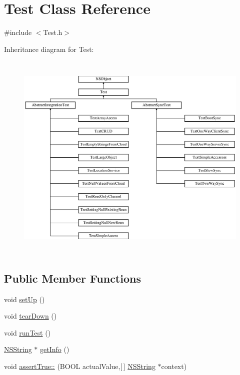 \hypertarget{interface_test}{
\section{\-Test \-Class \-Reference}
\label{interface_test}
}


{\ttfamily \#include $<$\-Test.\-h$>$}

\-Inheritance diagram for \-Test\-:\begin{figure}[H]
\begin{center}
\leavevmode
\includegraphics[height=10.224720cm]{interface_test}
\end{center}
\end{figure}
\subsection*{\-Public \-Member \-Functions}
\begin{DoxyCompactItemize}
\item 
void \hyperlink{interface_test_a760ec175e6e90406061ce0acbcc6e138}{set\-Up} ()
\item 
void \hyperlink{interface_test_a94c6ddb4188e0945b0450ed1591ba3ed}{tear\-Down} ()
\item 
void \hyperlink{interface_test_a4b61a484928fcecf041041f0adcf7830}{run\-Test} ()
\item 
\hyperlink{class_n_s_string}{\-N\-S\-String} $\ast$ \hyperlink{interface_test_ae4dc201a74175fe53c1a84a2bb7cce13}{get\-Info} ()
\item 
void \hyperlink{interface_test_a8a004bd8b5d74c17eace9cd01678f7e1}{assert\-True\-::} (\-B\-O\-O\-L actual\-Value,\mbox{[}$\,$\mbox{]} \hyperlink{class_n_s_string}{\-N\-S\-String} $\ast$context)
\end{DoxyCompactItemize}
